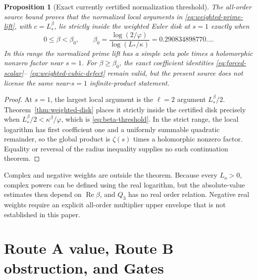 \documentclass[11pt]{article}
\numberwithin{equation}{section}
\newtheorem{proposition}[theorem]{Proposition}
\theoremstyle{remark}
\newcommand{\RePart}{\operatorname{Re}}
\begin{document}
\begin{proposition}[Exact currently certified normalization threshold]
\label{prop:beta-threshold}
The all-order source bound proves that the normalized local arguments in
\eqref{eq:weighted-prime-lift}, with \(c=L_*^\beta\), lie strictly inside the
weighted Euler disk at \(s=1\) exactly when
\begin{equation}
 0\le\beta<\beta_0,
 \qquad
 \beta_0=
 \frac{\log(2/\varphi)}{\log(L_*/\kappa)}
 =0.290834898770\ldots.
 \label{eq:beta-threshold}
\end{equation}
In this range the normalized prime lift has a simple zeta pole times a
holomorphic nonzero factor near \(s=1\).  For \(\beta\ge\beta_0\), the exact
coefficient identities \eqref{eq:forced-scalar}--
\eqref{eq:weighted-cubic-defect} remain valid, but the present source does not
license the same near-\(s=1\) infinite-product statement.
\end{proposition}

\begin{proof}
At \(s=1\), the largest local argument is the \(\ell=2\) argument
\(
L_*^\beta/2
\).  Theorem~\ref{thm:weighted-disk} places it strictly inside the certified
disk precisely when
\(
L_*^\beta/2<\kappa^\beta/\varphi
\), which is \eqref{eq:beta-threshold}.  In the strict range, the local
logarithm has first coefficient one and a uniformly summable quadratic
remainder, so the global product is \(\zeta(s)\) times a holomorphic nonzero
factor.  Equality or reversal of the radius inequality supplies no such
continuation theorem.
\end{proof}

Complex and negative weights are outside the theorem.  Because every
\(L_o>0\), complex powers can be defined using the real logarithm, but the
absolute-value estimates then depend on \(\RePart\beta\), and \(Q_3\) has no
real order relation.  Negative real weights require an explicit all-order
multiplier upper envelope that is not established in this paper.

\section{Route A value, Route B obstruction, and Gates}
\end{document}
